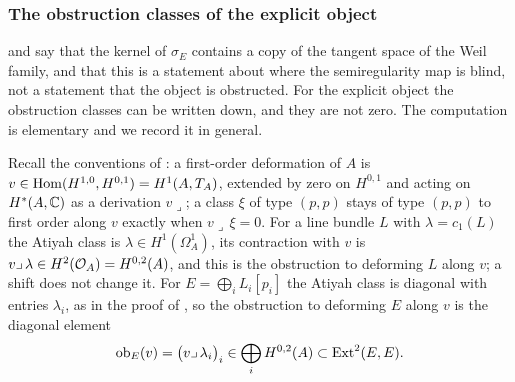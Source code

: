 \subsubsection*{The obstruction classes of the explicit object}

\cite[Corollary~9.18]{paperI} and \cite[Remark~9.21]{paperI} say that the kernel of
$\sigma_{E}$ contains a copy of the tangent space of the Weil family, and
that this is a statement about where the semiregularity map is blind, not a
statement that the object is obstructed. For the explicit object the
obstruction classes can be written down, and they are not zero. The
computation is elementary and we record it in general.

Recall the conventions of \cite[Section~9.3]{paperI}: a first-order deformation of
$A$ is $v\in\operatorname{Hom}(H^{1,0},H^{0,1})=H^{1}(A,T_{A})$, extended by zero on
$H^{0,1}$ and acting on $H^{*}(A,\mathbb{C})$ as a derivation $v\lrcorner$; a class
$\xi$ of type $(p,p)$ stays of type $(p,p)$ to first order along $v$ exactly
when $v\lrcorner\,\xi=0$. For a line bundle $L$ with $\lambda=c_{1}(L)$ the
Atiyah class is $\lambda\in H^{1}(\Omega^{1}_{A})$, its contraction with $v$
is $v\lrcorner\,\lambda\in H^{2}(\mathcal{O}_{A})=H^{0,2}(A)$, and this is the
obstruction to deforming $L$ along $v$; a shift does not change it. For
$E=\bigoplus_{i}L_{i}[p_{i}]$ the Atiyah class is diagonal with entries
$\lambda_{i}$, as in the proof of , so the
obstruction to deforming $E$ along $v$ is the diagonal element
\begin{equation}\label{eq:obdef}
  \operatorname{ob}_{E}(v)=\bigl(v\lrcorner\,\lambda_{i}\bigr)_{i}
  \in\bigoplus_{i}H^{0,2}(A)\subset\operatorname{Ext}^{2}(E,E).
\end{equation}

